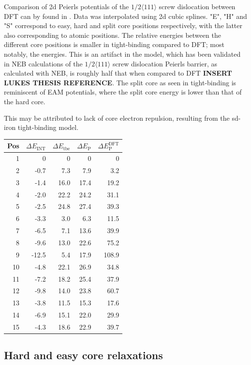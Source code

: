 \documentclass[a4paper]{article}
\begin{document}
Comparison of 2d Peierls potentials of the \(1/2\langle 111 \rangle\) screw dislocation between
DFT can by found in \cite{Itakura2012}. Data was interpolated using 2d cubic splines. "E", "H"
and "S" correspond to easy, hard and split core positions respectively, with the latter also
corresponding to atomic positions. The relative energies between the different core
positions is smaller in tight-binding compared to DFT; most notably, the energies. This is
an artifact in the model, which has been validated in NEB calculations of the \(1/2\langle
	111\rangle\) screw dislocation Peierls barrier, as calculated with NEB, is roughly half that
when compared to DFT \textbf{INSERT LUKES THESIS REFERENCE}. The split core as seen in
tight-binding is reminiscent of EAM potentials, where the split core energy is lower than
that of the hard core.

This may be attributed to lack of core electron	repulsion, resulting from the sd-iron tight-binding model. 

\begin{center}
\begin{tabular}{rrrrr}
Pos & \(\Delta E_{\text{INT}}\) & \(\Delta E_{\text{tbe}}\) & \(\Delta E_{\text{P}}\) & \(\Delta E_{\text{P}}^{\text{DFT}}\)\\
\hline
1 & 0 & 0 & 0 & 0\\
2 & -0.7 & 7.3 & 7.9 & 3.2\\
3 & -1.4 & 16.0 & 17.4 & 19.2\\
4 & -2.0 & 22.2 & 24.2 & 31.1\\
5 & -2.5 & 24.8 & 27.4 & 39.3\\
6 & -3.3 & 3.0 & 6.3 & 11.5\\
7 & -6.5 & 7.1 & 13.6 & 39.9\\
8 & -9.6 & 13.0 & 22.6 & 75.2\\
9 & -12.5 & 5.4 & 17.9 & 108.9\\
10 & -4.8 & 22.1 & 26.9 & 34.8\\
11 & -7.2 & 18.2 & 25.4 & 37.9\\
12 & -9.8 & 14.0 & 23.8 & 60.7\\
13 & -3.8 & 11.5 & 15.3 & 17.6\\
14 & -6.9 & 15.1 & 22.0 & 29.9\\
15 & -4.3 & 18.6 & 22.9 & 39.7\\
\end{tabular}
\end{center}

\subsection{Hard and easy core relaxations}
\label{sec:org8a4edad}
\end{document}
